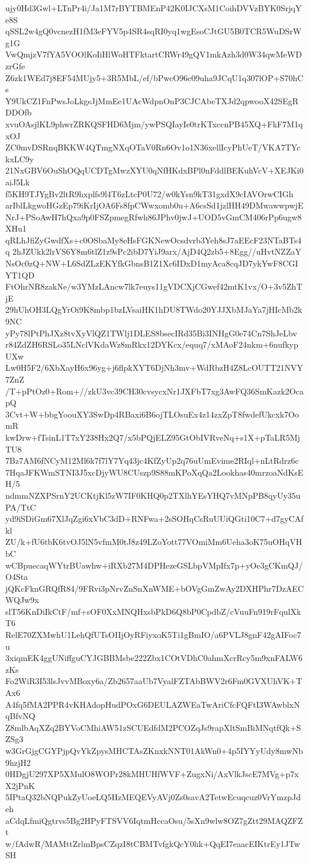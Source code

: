 ujy0Hd3Gwl+LTnPr4i/Ja1M7rBYTBMEnP42K0IJCXsM1CoihDVVzBYK0SrjqYe8S
qSSL2w4gQ0vcnezH1fM3eFYV5p4SR4sqRI0yq1wgEsoCJtGU5B0TCR5WuDSrWg1G
VwQmjzV7fYA5VOOlKoIiHlWoHTFktartCRWr49gQV1mkAzh3d0W34qwMeWDzrGfe
Z6zk1WEd7j8EF54MUjy5+3R5MbL/ef/bPwcO96c09uha9JCqU1q307lOP+S70hCs
Y9UkCZ1FnPwsJoLkgsJjMmEe1UAcWdpnOnP3CJCAbeTXJd2qpwooX42SEgRDDOfb
xvuOAsjlKL9phwrZRKQSFHD6Mjm/ywPSQIayIe0trKTxccnPB45XQ+FkF7M1qxOJ
ZC0mvDSRnqBKKW4QTmgNXqOTaV0Rn6Ov1o1N36xellIcyPhUeT/VKA7TYckxLC9y
21NxGBV6OuShOQqUCDTgMwzXYU0qNfHKdxBPl0nFddlBEKuhVcV+XEJKi0aiJ5Lk
f5KH9TJYgBv2ltR9hxplfs9l4T6zLtcP0U72/w0kYsn9kT31gxdX9cIAVOrwCIGh
arIblLkgwoHGzEp79iKrIjOA6Fs8fpCWwxomb0u+A6csSd1jzlHH49DMwawwpwjE
NrJ+PSoAwH7hQxa9p0FSZpmegRfwh86JPhv0jwJ+UOD5vGmCM406rPp6ugw8XHu1
qRLhJfiZyGwdfXs+c0OSbaMy8eHsFGKNewOcsdvrb3Yeh8sJ7aEEcF23NTaBTs4q
2hJZUkk2lrVS6Y8m6tlZ1z9sPc2ibD7YiJ9arx/AjD4Q2zb5+8Egg//uHvtNZZaY
NsOc0zQ+NW+L6SdZLzEKYfkGbnsB1Z1Xc6IDxD1myAca8cqJD7ykYwF8CGIYT1QD
FtOhrNR8zakNe/w3YMzLAncw7lk7euys11gVDCXjCGwef42mtK1vx/O+3v5ZhTjE
29hUhOH3LQgYrOi9K8mbp1bzLVsaiHK1hDU8TWdo20YJJXbMJaYa7jHIcMb2k9NC
yPy78lPtPhJXz8tvXyVlQZ1TWlj1DLES8bsecIRd35Bi3INHgG0e74Cn7ShJeLbv
r84ZdZH6RSLo35LNclVKdaWz8mRkx12DYKcx/equq7/xMAoF24nkm+6nufkypUXw
Lw0H5F2/6XbXayH6x96yg+j6flpkXYT6DjNh3mv+WdRbzH4Z8LcOUTT21NVY7ZnZ
/T+pPtOz0+Rom+//zkU3vc39CH30cvsycxNr1JXFbT7xg3AwFQ36SmKazk2OcapQ
3Cvt+W+bbgYoouXY3SwDp4RBaxi6B6ojTLOsuEx4z14zxZpT8fwdefUkcxk7OomR
kwDrw+fTsinL1T7xY238Hx2Q7/x5bPQjELZ95GtObIVRveNq+s1X+pTaLR5MjTU8
7Bz7AM6fNCyM12Ml6k7f7lY7Yq43jc4KfZyUp2q76uUmEvime2RIql+nLtRdrz6c
7HqaJFKWmSTNI3J5xcDjyWU8CUszp9S88mKPoXqQa2Lookhas40mrzoaNdKsEH/5
ndmmNZXPSrnY2UCKtjKl5zW7IF0KHQ0p2TXlhYEsYHQ7vMNpPB8qyUy35uPA/TtC
yd9iSDiGm67XlJqZgi6xVbC3dD+RNFwa+2sSOHqCsRuUUiQGti10C7+d7gyCAfkl
ZU/k+fU6tbK6tvOJ5lN5vfmM0tJ8z49LZoYott77VOmiMm6Ueha3oK75uOHqVHbC
wCBpuecaqWYtrBUawhw+iRXb27M4DPHezeGSLbpVMpIfx7p+yOe3gCKmQJ/O4Sta
jQKcFknGRQfR84/9FRvi3pNrvZnSnXnWME+bOVgGmZwAy2DXHPhr7DzAECWQJw9x
slT56KnDiIkCtF/mf+sOF0XxMNQHxsbPkD6Q8bP0CpdbZ/cVuuFn919rFqulXkT6
RelE70ZXMwhU1LehQfUTsOIIjOyRFiyxoK5Ti1gBmIO/a6PVLJ8gnF42gAIFoc7u
3xiqmEK4ggUNiffguCYJGBBMsbe222Zbx1COtVDhC0ahmXcrRcy5m9xnFALW6zKs
Fo2WiR3I53lsJvvMBoxy6a/Zb2657aaUb7VyalFZTAbBWV2r6Fm0GVXUhVK+TAx6
A4fq5fMA2PPR4vKHAdopHudPOxG6DEULAZWEaTwAriCfcFQFtI3WAwblxNqBfvNQ
Z8mlbAqXZq2BYVoCMhiAW51zSCUEdfdM2PCOZqJs9rapXltSmBiMNqtfQk+SZSg3
w3GrGjgCGYPjpQvYkZpysMHCTAsZKnxkNNT01AkWn0+4p5IYYyUdy8mwNb9hzjH2
0HDgjU297XP5XMulO8WOPr28kMHUHfWVF+ZugxNi/AxVlkJscE7MVg+p7xX2jPnK
5IPtaQ32bNQPukZyUoeLQ5HzMEQEVyAVj0Zs0savA2TetwEcuqcuz0VrYmzpJdeh
aCdqLfmiQgtrvs5Bg2HPyFTSVV6IqtmHccaOsu/5sXn9wlw8OZ7gZtt29MAQZFZt
w/fAdwR/MAMttZrlmBpsCZqzI8tCBMTvfgkQcY0hk+QqEI7eaacEIKtrEy1JTwSH
